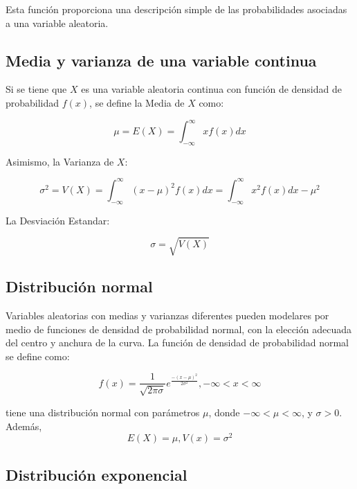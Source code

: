 Esta función proporciona una descripción simple de las probabilidades asociadas a una variable aleatoria.
\subsection{Media y varianza de una variable continua}

Si se tiene que $X$ es una variable aleatoria continua con función de densidad de probabilidad $f(x)$, se define la Media de $X$ como:

\begin{equation*}
\mu=E(X)=\int_{-\infty}^{\infty}xf(x)dx
\end{equation*}

Asimismo, la Varianza de $X$:

\begin{equation*}
\sigma^2=V(X)=\int_{-\infty}^{\infty}(x-\mu)^{2}f(x)dx=\int_{-\infty}^{\infty}x^{2}f(x)dx-\mu^2
\end{equation*}

La Desviación Estandar:

\begin{equation*}
\sigma=\sqrt{V(X)}
\end{equation*}

\subsection{Distribución normal}

Variables aleatorias con medias y varianzas diferentes pueden modelares por medio de funciones de densidad de probabilidad normal, con la elección adecuada del centro y anchura de la curva. La función de densidad de probabilidad normal se define como:

\begin{equation*}
f(x)=\frac{1}{\sqrt{2\pi\sigma}}e^{\frac{-(x-\mu)^2}{2\sigma^2}}  ,  -\infty<x<\infty
\end{equation*}

tiene una distribución normal con parámetros $\mu$, donde $-\infty<\mu<\infty$, y $\sigma>0$.\\

Además,
\begin{equation*}
E(X)=\mu , V(x)=\sigma^2
\end{equation*}

\subsection{Distribución exponencial}

